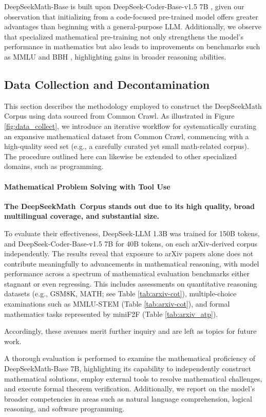 DeepSeekMath-Base is built upon DeepSeek-Coder-Base-v1.5 7B \citep{deepseek-coder}, given our observation that initializing from a code-focused pre-trained model offers greater advantages than beginning with a general-purpose LLM. Additionally, we observe that specialized mathematical pre-training not only strengthens the model’s performance in mathematics but also leads to improvements on benchmarks such as MMLU \citep{mmlu} and BBH \citep{bbh}, highlighting gains in broader reasoning abilities.

\subsection{Data Collection and Decontamination} 
This section describes the methodology employed to construct the DeepSeekMath Corpus using data sourced from Common Crawl. As illustrated in Figure \ref{fig:data_collect}, we introduce an iterative workflow for systematically curating an expansive mathematical dataset from Common Crawl, commencing with a high-quality seed set (e.g., a carefully curated yet small math-related corpus). The procedure outlined here can likewise be extended to other specialized domains, such as programming.

\paragraph{Mathematical Problem Solving with Tool Use}

\textbf{The DeepSeekMath~Corpus stands out due to its high quality, broad multilingual coverage, and substantial size.}

To evaluate their effectiveness, DeepSeek-LLM 1.3B was trained for 150B tokens, and DeepSeek-Coder-Base-v1.5 7B for 40B tokens, on each arXiv-derived corpus independently. The results reveal that exposure to arXiv papers alone does not contribute meaningfully to advancements in mathematical reasoning, with model performance across a spectrum of mathematical evaluation benchmarks either stagnant or even regressing. This includes assessments on quantitative reasoning datasets (e.g., GSM8K, MATH; see Table \ref{tab:arxiv-cot}), multiple-choice examinations such as MMLU-STEM (Table \ref{tab:arxiv-cot}), and formal mathematics tasks represented by miniF2F (Table \ref{tab:arxiv_atp}).

Accordingly, these avenues merit further inquiry and are left as topics for future work.

A thorough evaluation is performed to examine the mathematical proficiency of DeepSeekMath-Base 7B, highlighting its capability to independently construct mathematical solutions, employ external tools to resolve mathematical challenges, and execute formal theorem verification. Additionally, we report on the model’s broader competencies in areas such as natural language comprehension, logical reasoning, and software programming.

